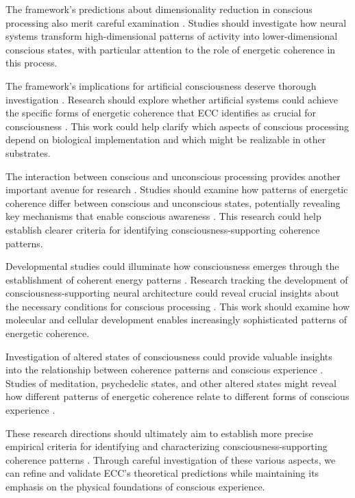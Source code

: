 The framework's predictions about dimensionality reduction in conscious processing also merit careful examination \cite{merleau2012phenomenology}. Studies should investigate how neural systems transform high-dimensional patterns of activity into lower-dimensional conscious states, with particular attention to the role of energetic coherence in this process.

The framework's implications for artificial consciousness deserve thorough investigation \cite{pigliucci2013philosophy}. Research should explore whether artificial systems could achieve the specific forms of energetic coherence that ECC identifies as crucial for consciousness \cite{block2009comparing}. This work could help clarify which aspects of conscious processing depend on biological implementation and which might be realizable in other substrates.

The interaction between conscious and unconscious processing provides another important avenue for research \cite{noe2009out}. Studies should examine how patterns of energetic coherence differ between conscious and unconscious states, potentially revealing key mechanisms that enable conscious awareness \cite{koch2019feeling}. This research could help establish clearer criteria for identifying consciousness-supporting coherence patterns.

Developmental studies could illuminate how consciousness emerges through the establishment of coherent energy patterns \cite{chalmers2010character}. Research tracking the development of consciousness-supporting neural architecture could reveal crucial insights about the necessary conditions for conscious processing \cite{seth2021being}. This work should examine how molecular and cellular development enables increasingly sophisticated patterns of energetic coherence.

Investigation of altered states of consciousness could provide valuable insights into the relationship between coherence patterns and conscious experience \cite{goff2019galileo}. Studies of meditation, psychedelic states, and other altered states might reveal how different patterns of energetic coherence relate to different forms of conscious experience \cite{thompson2014waking}.

These research directions should ultimately aim to establish more precise empirical criteria for identifying and characterizing consciousness-supporting coherence patterns \cite{dennett2017bacteria}. Through careful investigation of these various aspects, we can refine and validate ECC's theoretical predictions while maintaining its emphasis on the physical foundations of conscious experience.